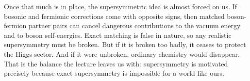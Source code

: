 Once that much is in place, the supersymmetric idea is almost forced on us. If bosonic and fermionic corrections come with opposite signs, then matched boson-fermion partner pairs can cancel dangerous contributions to the vacuum energy and to boson self-energies. Exact matching is false in nature, so any realistic supersymmetry must be broken. But if it is broken too badly, it ceases to protect the Higgs sector. And if it were unbroken, ordinary chemistry would disappear. That is the balance the lecture leaves us with: supersymmetry is motivated precisely because exact supersymmetry is impossible for a world like ours.